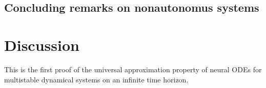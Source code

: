 \documentclass{article}
\theoremstyle{definition} \newtheorem{definition}{Definition}
\theoremstyle{remark} \newtheorem{remark}{Remark}
\newcommand{\reals}{\mathbb{R}}
\newcounter{ct}
\begin{document}


%
%





    
\subsection{Concluding remarks on nonautonomus systems}


\section{Discussion}
This is the first proof of the universal approximation property of neural ODEs for multistable dynamical systems on an infinite time horizon.
\end{document}
